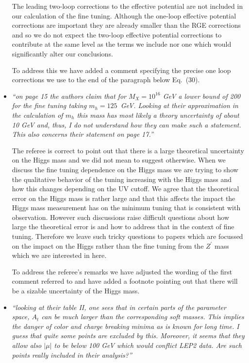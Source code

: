 \documentclass[12pt]{article}
\begin{document}
\begin{itemize}
The leading two-loop corrections to the effective potential are not
included in our calculation of the fine tuning.  Although the one-loop
effective potential corrections are important they are already smaller
than the RGE corrections and so we do not expect the two-loop
effective potential corrections to contribute at the same level as
the terms we include nor one which would significantly alter our
conclusions.

To address this we have added a comment specifying the precise one
loop corrections we use to the end of the paragraph below Eq.~(30).

\item {\it ``on page 15 the authors claim that for $M_X = 10^{16}$ GeV a
lower bound of 200 for the fine tuning taking $m_h = 125$~GeV. Looking
at their approximation in the calculation of $m_h$ this mass has most
likely a theory uncertainty of about 10 GeV and, thus, I do not
understand how they can make such a statement.  This also concerns
their statement on page 17.''}

The referee is correct to point out that there is a large theoretical
uncertainty on the Higgs mass and we did not mean to suggest
otherwise.  When we discuss the fine tuning dependence on the Higgs
mass we are trying to show the qualitative behavior of the tuning
increasing with the Higgs mass and how this changes depending on the
UV cutoff.  We agree that the theoretical error on the Higgs mass is
rather large and that this affects the impact the Higgs mass
measurement has on the minimum tuning that is consistent with
observation.  However such discussions raise difficult questions about
how large the theoretical error is and how to address that in the context
of fine tuning.  Therefore we leave such tricky questions to papers
which are focussed on the impact on the Higgs rather than the fine
tuning from the $Z^\prime$ mass which we are interested in here.

To address the referee's remarks we have adjusted the wording of the
first comment referred to and have added a footnote pointing out that
there will be a sizable uncertainty of the Higgs mass.

\item {\it ``looking at their table II, one sees that in certain parts of
the parameter space, $A_t$ can be much larger than the corresponding soft
masses. This implies the danger of color and charge breaking minima as is
known for long time. I guess that quite some points are excluded by this.
Moreover, it seems that they allow also $|\mu|$ to be below 100 GeV which
would conflict LEP2 data. Are such points really included in their analysis?''}


\end{itemize}
\end{document}
